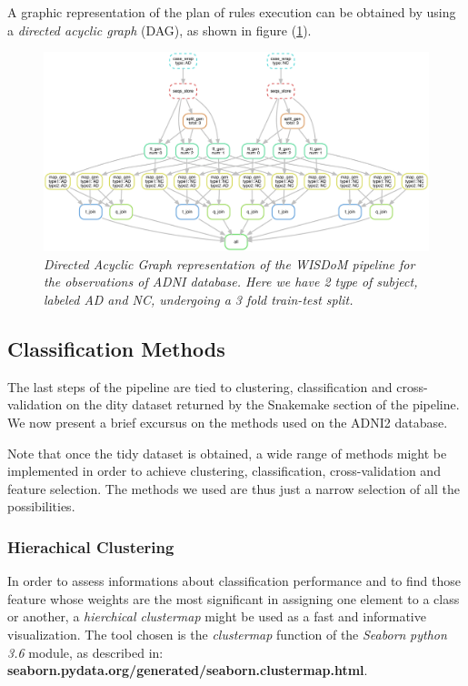 \documentclass[12pt,openright,twoside,a4paper]{book}
\begin{document}
A graphic representation of the plan of rules execution can be obtained by using a \textit{directed acyclic graph} (DAG), as shown in figure (\ref{dag}).

\clearpage

\begin{figure}[!h]
\centering
\includegraphics[scale=0.53, angle=270]{dag}
\caption{\textit{Directed Acyclic Graph representation of the WISDoM pipeline for the observations of ADNI database. Here we have 2 type of subject, labeled AD and NC, undergoing a 3 fold train-test split.}}
\label{dag}
\end{figure}

\subsection{Classification Methods}

The last steps of the pipeline are tied to clustering, classification and cross-validation on the dity dataset returned by the Snakemake section of the pipeline.
We now present a brief excursus on the methods used on the ADNI2 database.

Note that once the tidy dataset is obtained, a wide range of methods might be implemented in order to achieve clustering, classification, cross-validation and feature selection.
The methods we used are thus just a narrow selection of all the possibilities.

\subsubsection*{Hierachical Clustering}

In order to assess informations about classification performance and to find those feature whose weights are the most significant in assigning one element to a class or another, a \textit{hierchical clustermap} might be used as a fast and informative visualization.
The tool chosen is the \textit{clustermap} function of the \textit{Seaborn} \textit{python 3.6} module, as described in:\\ \textbf{seaborn.pydata.org/generated/seaborn.clustermap.html}.
\end{document}
